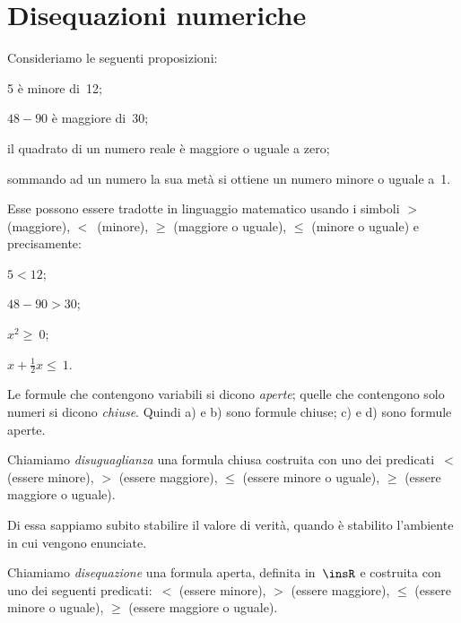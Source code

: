 \section{Disequazioni numeriche}
Consideriamo le seguenti proposizioni:

\begin{enumeratea}
\item 5 è minore di~12;
\item $48-90$ è maggiore di~30;
\item il quadrato di un numero reale è maggiore o uguale a zero;
\item sommando ad un numero la sua metà si ottiene un numero minore
o uguale a~1.
\end{enumeratea}

Esse possono essere tradotte in linguaggio matematico usando i simboli
$>$ (maggiore), $<$~(minore), ${\ge}$ (maggiore o uguale), ${\le}$ (minore o uguale) e precisamente:

\begin{multicols}{4}
 \begin{enumeratea}
\item $5<12$;
\item $48-90>30$;
\item $x^{2}\ge~0$;
\item $x+\frac{1}{2}x\le~1$.
 \end{enumeratea}
\end{multicols}

Le formule che contengono variabili si dicono \emph{aperte}; quelle che
contengono solo numeri si dicono \emph{chiuse}. Quindi a) e b) sono formule
chiuse; c) e d) sono formule aperte.

\begin{definizione}
 Chiamiamo \emph{disuguaglianza} una formula chiusa
costruita con uno dei predicati~$<$ (essere minore),
$>$ (essere maggiore), ${\le}$ (essere minore o uguale),
${\ge}$ (essere maggiore o uguale).
\end{definizione}

Di essa sappiamo subito stabilire il valore di verità, quando è
stabilito l'ambiente in cui vengono enunciate.

\begin{definizione}
Chiamiamo \emph{disequazione} una formula aperta,
definita in~$\insR$ e costruita con uno dei seguenti predicati:~$<$
(essere minore), $>$ (essere maggiore), ${\leq}$
(essere minore o uguale), ${\geq}$ (essere
maggiore o uguale).
\end{definizione}

